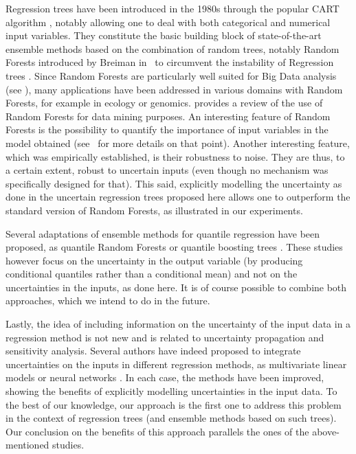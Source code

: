 \documentclass[twoside,11pt]{article}
\begin{document}
Regression trees have been introduced in the 1980s through the popular CART algorithm \cite{breiman1984classification}, notably allowing one to deal with both categorical and numerical input variables. They constitute the basic building block of state-of-the-art ensemble methods based on the combination of random trees, notably Random Forests introduced by Breiman in~\cite{breiman2001random} to circumvent the instability of Regression trees \cite{gey2006}. Since Random Forests are particularly well suited for Big Data analysis (see \cite{genuer2017}), many applications have been addressed in various domains with Random Forests, for example in ecology or genomics. \cite{verikas2011} provides a review of the use of Random Forests for data mining purposes. An interesting feature of Random Forests is the possibility to quantify the importance of input variables in the model obtained (see~\cite{genuer2010} for more details on that point). Another interesting feature, which was empirically established, is their robustness to noise. They are thus, to a certain extent, robust to uncertain inputs (even though no mechanism was specifically designed for that). This said, explicitly modelling the uncertainty as done in the uncertain regression trees proposed here allows one to outperform the standard version of  Random Forests, as illustrated in our experiments. 

Several adaptations of ensemble methods for quantile regression have been proposed, as quantile Random Forests or quantile boosting trees \cite{fenske2011identifying, kriegler2007boosting, kriegler2010small,meinshausen2006quantile,zheng2012}. These studies however focus on the uncertainty in the output variable (by producing conditional quantiles rather than a conditional mean) and not on the uncertainties in the inputs, as done here. It is of course possible to combine both approaches, which we intend to do in the future.

Lastly, the idea of including information on the uncertainty of the input data in a regression method is not new and is related to uncertainty propagation and sensitivity analysis. Several authors have indeed proposed to integrate uncertainties on the inputs in different regression methods, as multivariate linear models \cite{reis2005} or neural networks \cite{gal2016}. In each case, the methods have been improved, showing the benefits of explicitly modelling uncertainties in the input data. To the best of our knowledge, our approach is the first one to address this problem in the context of regression trees (and ensemble methods based on such trees). Our conclusion on the benefits of this approach parallels the ones of the above-mentioned studies.
\end{document}
